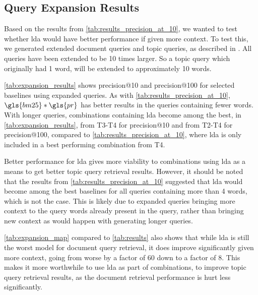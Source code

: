\subsection{Query Expansion Results}

Based on the results from \autoref{tab:results_precision_at_10}, we wanted to test whether \gls{lda} would have better performance if given more context.
To test this, we generated extended document queries and topic queries, as described in .
All queries have been extended to be 10 times larger. 
So a topic query which originally had 1 word, will be extended to approximately 10 words.

\autoref{tab:expansion_results} shows precision@10 and precision@100 for selected baselines using expanded queries.
As with \autoref{tab:results_precision_at_10}, $\gls{bm25} * \gls{pr}$ has better results in the queries containing fewer words.
With longer queries, combinations containing \gls{lda} become among the best, in \autoref{tab:expansion_results}, from T3-T4 for precision@10 and from T2-T4 for precision@100, compared to \autoref{tab:results_precision_at_10}, where \gls{lda} is only included in a best performing combination from T4.

Better performance for \gls{lda} gives more viability to combinations using \gls{lda} as a means to get better topic query retrieval results.
However, it should be noted that the results from \autoref{tab:results_precision_at_10} suggested that \gls{lda} would become among the best baselines for all queries containing more than 4 words, which is not the case.
This is likely due to expanded queries bringing more context to the query words already present in the query, rather than bringing new context as would happen with generating longer queries.

\autoref{tab:expansion_map} compared to \autoref{tab:results} also shows that while \gls{lda} is still the worst model for document query retrieval, it does improve significantly given more context, going from worse by a factor of 60 down to a factor of 8.
This makes it more worthwhile to use \gls{lda} as part of combinations, to improve topic query retrieval results, as the document retrieval performance is hurt less significantly.  

